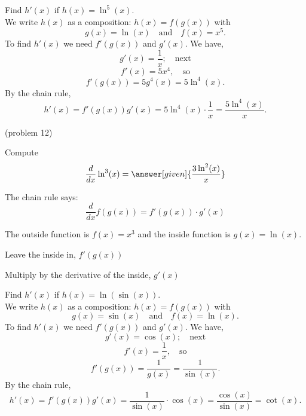 \documentclass{ximera}
\begin{document}
\begin{example}[example 12]
Find $h'(x)$ if $h(x) = \ln^5(x)$.\\
We write $h(x)$ as a composition: $h(x)=f(g(x))$ with 
\[g(x) = \ln(x)  \quad \text{and} \quad  f(x) = x^5.\]
 To find $h'(x)$ we need $f'(g(x))$ and $g'(x)$.  We have, 
\[g'(x) = \frac{1}{x}; \quad \text{next} \] 
\[f'(x) = 5x^4, \quad \text{so} \]
\[f'(g(x)) = 5g^4(x) = 5\ln^4(x).\]
By the chain rule,
\[h'(x) = f'(g(x))g'(x) = 5\ln^4(x)\cdot \frac{1}{x}  = \frac{5\ln^4(x)}{x}.\]
\end{example}

\begin{center}
\begin{foldable}
\end{foldable}
\end{center}


\begin{problem}(problem 12)
  
Compute
  \[
  \frac{d}{dx} \ln^3(x) = \answer[given]{\frac{3\ln^2(x)}{x}}
  \]
  
    \begin{hint}
      The chain rule says:
      \[
      \frac{d}{dx} f(g(x)) = f'(g(x))\cdot g'(x)
      \]
    \end{hint}
    \begin{hint}
      The outside function is $f(x) = x^3$ and the inside
      function is $g(x) = \ln(x)$.
    \end{hint}
    \begin{hint}
		  Leave the inside in, $f'(g(x))$
		\end{hint}
		\begin{hint}
		  Multiply by the derivative of the inside, $g'(x)$
		\end{hint}
		
\end{problem}



\begin{example}[example 13]
Find $h'(x)$ if $h(x) = \ln(\sin(x))$.\\
We write $h(x)$ as a composition: $h(x)=f(g(x))$ with 
\[g(x) = \sin(x)  \quad \text{and} \quad  f(x) = \ln(x).\]
 To find $h'(x)$ we need $f'(g(x))$ and $g'(x)$.  We have,
\[g'(x) = \cos(x); \quad \text{next} \]
\[f'(x) = \frac{1}{x}, \quad \text{so}\]
\[f'(g(x)) = \frac{1}{g(x)} = \frac{1}{\sin(x)}.\]
By the chain rule,
\[h'(x) = f'(g(x))g'(x) = \frac{1}{\sin(x)} \cdot \cos(x) = \frac{\cos(x)}{\sin(x)} = \cot(x).\]
\end{example}
\end{document}
